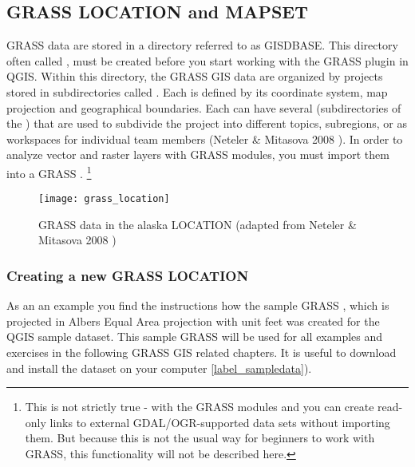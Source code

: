 \subsection{GRASS LOCATION and MAPSET}\label{sec:about_loc}

GRASS data are stored in a directory referred to as GISDBASE. This directory 
often called , must be created before you start working 
with the GRASS plugin in QGIS. Within this directory, the GRASS GIS data 
are organized by projects stored in subdirectories called . 
Each  is defined by its coordinate system, map projection 
and geographical boundaries. Each  can have several 
 (subdirectories of the ) that are used 
to subdivide the project into different topics, subregions, or as workspaces 
for individual team members (Neteler \& Mitasova 2008 
\cite{neteler_mitasova08}). In order to analyze vector and raster layers with 
GRASS modules, you must import them into a GRASS .
\footnote{This is not strictly true - with the GRASS modules 
 and  you can create read-only links 
to external GDAL/OGR-supported data sets without importing them. But because 
this is not the usual way for beginners to work with GRASS, this functionality 
will not be described here.}

\begin{figure}[ht]
\begin{center}
\caption{GRASS data in the alaska LOCATION (adapted from Neteler \& 
Mitasova 2008 \cite{neteler_mitasova08})}\label{fig:grass_location}\smallskip
\texttt{[image: grass\_location]}
\end{center}  
\end{figure}

\subsubsection{Creating a new GRASS LOCATION}\label{sec:create_loc}

As an an example you find the instructions how the sample GRASS
, which is projected in Albers Equal Area
projection with unit feet was created for the QGIS sample dataset. This
sample GRASS  will be used for all examples and
exercises in the following GRASS GIS related chapters. It is useful to
download and install the dataset on your computer \ref{label_sampledata}).

